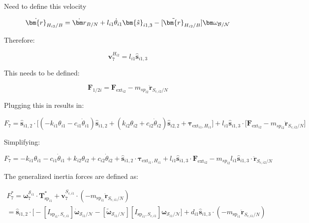 Need to define this velocity

\begin{equation}
	\dot{\bm{r}}_{H_{{i2}}/B} = \dot{\bm r}_{B/N} + l_{i1} \dot{\theta}_{i1} \bm{\hat{s}}_{i1,3}  - [\tilde{\bm{r}}_{H_{{i2}}/B}] \bm \omega_{\cal{B/N}}
\end{equation}

Therefore:

\begin{equation}
	\bm v^{H_{i2}}_{7} = l_{i1} \bm{\hat{s}}_{i1,3}
\end{equation}

This needs to be defined:

\begin{equation}
	\bm F_{1/2i} = \bm F_{\text{ext}_{i2}}  - m_{sp_{i2}} \ddot{\bm{r}}_{S_{c,i2}/N}
\end{equation}

Plugging this in results in:

\begin{equation}
	F_{7} = \bm{\hat{s}}_{i1,2} \cdot \Big[ (-k_{i1} \theta_{i1} - c_{i1} \dot{\theta}_{i1})\bm{\hat{s}}_{i1,2} + (k_{i2} \theta_{i2} + c_{i2} \dot{\theta}_{i2})\bm{\hat{s}}_{i2,2} + \bm \tau_{\text{ext}_{i1},H_{i1}} \Big] + l_{i1} \bm{\hat{s}}_{i1,3} \cdot \Big[\bm F_{\text{ext}_{i2}}  - m_{sp_{i2}} \ddot{\bm{r}}_{S_{c,i2}/N} \Big]
\end{equation}

Simplifying:

\begin{equation}
	F_{7} =  -k_{i1} \theta_{i1} - c_{i1} \dot{\theta}_{i1} + k_{i2} \theta_{i2} + c_{i2} \dot{\theta}_{i2} + \bm{\hat{s}}_{i1,2} \cdot \bm \tau_{\text{ext}_{i1},H_{i1}}  + l_{i1} \bm{\hat{s}}_{i1,3} \cdot \bm F_{\text{ext}_{i2}}  - m_{sp_{i2}} l_{i1} \bm{\hat{s}}_{i1,3} \cdot \ddot{\bm{r}}_{S_{c,i2}/N}
\end{equation}

The generalized inertia forces are defined as:

\begin{multline}
	F^*_{7} = \bm \omega_{\textit{7}}^{\mathcal{S}_{i1}} \cdot \bm T^*_{\text{sp}_{i1}}  + \bm v^{S_{c,i1}}_{7} \cdot (-m_{\text{sp}_{i1}} \ddot{\bm{r}}_{S_{c,i1}/N}) \\
	= \bm{\hat{s}}_{i1,2} \cdot \Big[-[I_{\text{sp}_{i1},S_{c,i1}}] \dot{\bm\omega}_{\mathcal{S}_{i1}/\mathcal{N}}  -[\tilde{\bm \omega}_{\mathcal{S}_{i1}/\mathcal{N}}] [I_{\text{sp}_{i1},S_{c,i1}}] \bm \omega_{\mathcal{S}_{i1}/\mathcal{N}} \Big] + d_{i1} \bm{\hat{s}}_{i1,3} \cdot (-m_{\text{sp}_{i1}} \ddot{\bm{r}}_{S_{c,i1}/N})
\end{multline}


